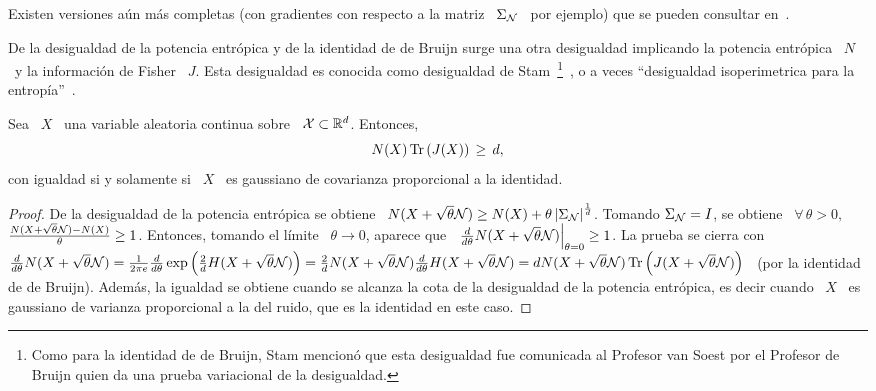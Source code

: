 Existen versiones a\'un m\'as completas  (con gradientes con respecto a la matriz
\  $\Sigma_{\mathcal{N}}$  \  por  ejemplo)  que se  pueden  consultar  en~\cite{Joh04,
  PalVer06, PayPal09}.




\label{Ssec:SZ:Stam}


De la  desigualdad de  la potencia entr\'opica  y de  la identidad de  de Bruijn
surge  una otra  desigualdad implicando  la potencia  entr\'opica \  $N$ \  y la
informaci\'on de Fisher \ $J$.  Esta desigualdad es conocida como desigualdad de
Stam~\footnote{Como para  la identidad  de de Bruijn,  Stam mencion\'o  que esta
  desigualdad fue  comunicada al  Profesor van Soest  por el Profesor  de Bruijn
  quien  da una  prueba variacional  de la  desigualdad.}~\cite{CovTho06, Rio07,
  Sta59},     o    a    veces     ``desigualdad    isoperimetrica     para    la
entrop\'ia''~\cite{WanMad04}.
%
\begin{teorema}
\label{Teo:SZ:Stam}
%
  Sea  \  $X$   \  una  variable  aleatoria  continua   sobre  \  $\mathcal{X}  \subset
  \mathbb{R}^d$. Entonces,
  \[
  N(X) \operatorname{Tr}\left( J(X) \right) \, \ge \, d,
  \]
  con igualdad si y solamente si \ $X$ \ es gaussiano de covarianza proporcional
  a la identidad.
\end{teorema}
%
\begin{proof}
  De la desigualdad de la potencia entr\'opica se obtiene \ $N(X + \sqrt{\theta}
  \mathcal{N})  \ge N(X)  + \theta  \left| \Sigma_{\mathcal{N}}  \right|^{\frac1d}$. Tomando
  $\Sigma_{\mathcal{N}} =  I$, se  obtiene \ $\forall  \, \theta  > 0,$ \  $\frac{N(X +
    \sqrt{\theta} \mathcal{N}) - N(X)}{\theta}  \ge 1$.  Entonces, tomando el l\'imite
  \ $\theta \to 0$, aparece  que \ $\left. \frac{d}{d\theta} N(X + \sqrt{\theta}
    \mathcal{N})   \right|_{\theta  =   0}  \ge   1$.   La   prueba  se   cierra  con
  $\frac{d}{d\theta}  N(X   +  \sqrt{\theta}   \mathcal{N})  =  \frac{1}{2   \pi  e}
  \frac{d}{d\theta}  \exp\left( \frac2d  H(X +  \sqrt{\theta} \mathcal{N})  \right) =
  \frac2d  N(X +  \sqrt{\theta}  \mathcal{N}) \frac{d}{d\theta}  H(X +  \sqrt{\theta}
  \mathcal{N}) = d N(X +  \sqrt{\theta} \mathcal{N}) \operatorname{Tr}\left( J(X + \sqrt{\theta} \mathcal{N})
  \right)$ \ (por la identidad de  de Bruijn).  Adem\'as, la igualdad se obtiene
  cuando se  alcanza la cota  de la desigualdad  de la potencia  entr\'opica, es
  decir cuando \ $X$ \ es gaussiano de varianza proporcional a la del ruido, que
  es la identidad en este caso.
\end{proof}
